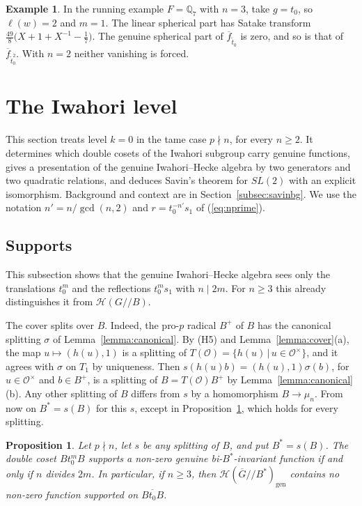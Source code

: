 \documentclass[12pt,letterpaper]{amsart}
\numberwithin{equation}{section}
\newtheorem{proposition}[theorem]{Proposition}
\theoremstyle{definition}
\newtheorem{example}[theorem]{Example}
\theoremstyle{remark}
\newcommand{\cO}{\mathcal{O}}
\newcommand{\cH}{\mathcal{H}}
\newcommand{\Gbar}{\overline{G}}
\newcommand{\gen}{\mathrm{gen}}
\newcommand{\fbar}{\overline{f}}
\begin{document}
\begin{example}
\label{ex:spherical}
In the running example $F=\mathbb{Q}_7$ with $n=3$, take $g=t_0$, so
$\ell(w)=2$ and $m=1$. The linear spherical part has Satake transform
$\frac{49}{8}\bigl(X+1+X^{-1}-\frac17\bigr)$. The genuine spherical
part of $\fbar_{\tilde t_0}$ is zero, and so is that of
$\fbar_{\tilde t_0^2}$. With $n=2$ neither vanishing is forced.
\end{example}

\section{The Iwahori level}
\label{section:savin}

This section treats level $k=0$ in the tame case $p\nmid n$, for every
$n\geq 2$. It determines which double cosets of the Iwahori subgroup
carry genuine functions, gives a presentation of the genuine
Iwahori--Hecke algebra by two generators and two quadratic relations,
and deduces Savin's theorem for $SL(2)$ with an explicit isomorphism.
Background and context are in Section~\ref{subsec:savinbg}. We use the
notation $n'=n/\gcd(n,2)$ and $r=t_0^{-n'}s_1$ of (\ref{eq:nprime}).

\subsection{Supports}
This subsection shows that the genuine Iwahori--Hecke algebra sees only
the translations $t_0^m$ and the reflections $t_0^ms_1$ with $n\mid
2m$. For $n\geq 3$ this already distinguishes it from $\cH(G/\!/B)$.

The cover splits over $B$. Indeed, the pro-$p$ radical $B^+$ of $B$
has the canonical splitting $\sigma$ of Lemma~\ref{lemma:canonical}. By
(H5) and Lemma~\ref{lemma:cover}(a), the map $u\mapsto(h(u),1)$ is a
splitting of $T(\cO)=\{h(u)\,|\,u\in\cO^\times\}$, and it agrees with
$\sigma$ on $T_1$ by uniqueness. Then
$s(h(u)b)=(h(u),1)\sigma(b)$, for $u\in\cO^\times$ and $b\in B^+$, is a
splitting of $B=T(\cO)B^+$ by Lemma~\ref{lemma:canonical}(b). Any other
splitting of $B$ differs from $s$ by a homomorphism $B\to\mu_n$. From
now on $B^*=s(B)$ for this $s$, except in
Proposition~\ref{prop:level0}, which holds for every splitting.

\begin{proposition}
\label{prop:level0}
Let $p\nmid n$, let $s$ be any splitting of $B$, and put $B^*=s(B)$.
The double coset $Bt_0^mB$ supports a non-zero genuine
bi-$B^*$-invariant function if and only if $n$ divides $2m$. In
particular, if $n\geq 3$, then $\cH(\Gbar/\!/B^*)_{\gen}$ contains no non-zero
function supported on $\overline{Bt_0B}$.
\end{proposition}
\end{document}
